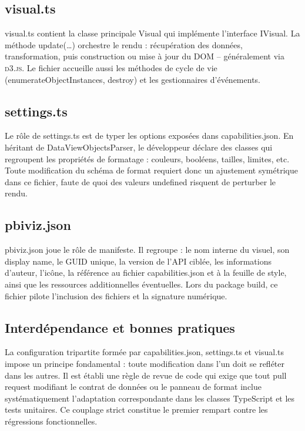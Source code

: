 \subsection{visual.ts}

visual.ts contient la classe principale Visual qui implémente l’interface IVisual. La méthode update(\dots) orchestre le rendu : récupération des données, transformation, puis construction ou mise à jour du DOM -- généralement via \textsc{d3.js}. Le fichier accueille aussi les méthodes de cycle de vie (enumerateObjectInstances, destroy) et les gestionnaires d’événements.

\subsection{settings.ts}

Le rôle de settings.ts est de typer les options exposées dans capabilities.json. En héritant de DataViewObjectsParser, le développeur déclare des classes qui regroupent les propriétés de formatage : couleurs, booléens, tailles, limites, etc. Toute modification du schéma de format requiert donc un ajustement symétrique dans ce fichier, faute de quoi des valeurs undefined risquent de perturber le rendu.

\subsection{pbiviz.json}

pbiviz.json joue le rôle de manifeste. Il regroupe : le nom interne du visuel, son display name, le GUID unique, la version de l’API ciblée, les informations d’auteur, l’icône, la référence au fichier capabilities.json et à la feuille de style, ainsi que les ressources additionnelles éventuelles. Lors du package build, ce fichier pilote l’inclusion des fichiers et la signature numérique.

\subsection{Interdépendance et bonnes pratiques}

La configuration tripartite formée par capabilities.json, settings.ts et visual.ts impose un principe fondamental : toute modification dans l’un doit se refléter dans les autres. Il est établi une règle de revue de code qui exige que tout pull request modifiant le contrat de données ou le panneau de format inclue systématiquement l’adaptation correspondante dans les classes TypeScript et les tests unitaires. Ce couplage strict constitue le premier rempart contre les régressions fonctionnelles.

